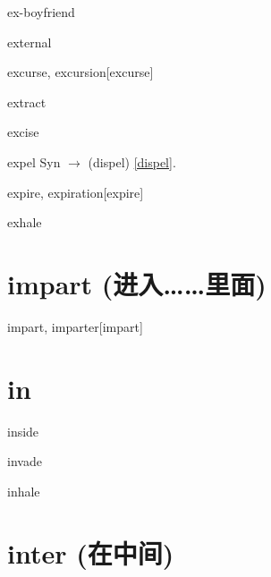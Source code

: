 \begin{wordRef}{ex-boyfriend}
\end{wordRef}

\begin{wordRef}{external}
\end{wordRef}

\begin{wordRef}{excurse, excursion}[excurse]
\end{wordRef}

\begin{wordRef}{extract}
\end{wordRef}

\begin{wordRef}{excise}
\end{wordRef}

\begin{wordRef}{expel}
    Syn $\rightarrow$ (dispel) \ref{dispel}.
\end{wordRef}

\begin{wordRef}{expire, expiration}[expire]
\end{wordRef}

\begin{wordRef}{exhale}
\end{wordRef}

\section{impart (进入……里面)}
\begin{wordRef}{impart, imparter}[impart]
\end{wordRef}

\section{in}

\begin{wordRef}{inside}
\end{wordRef}

\begin{wordRef}{invade}
\end{wordRef}

\begin{wordRef}{inhale}
\end{wordRef}

\section{inter (在中间)}

